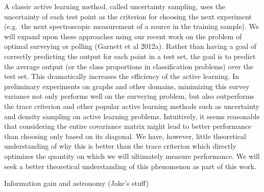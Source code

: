 \documentclass[useAMS,usenatbib,tightenlines,11pt,preprint]{aastex}
\begin{document}
A classic active learning method, called uncertainty sampling, uses
the uncertainty of each test point as the criterion for choosing the
next experiment (e.g.\ the next spectroscopic measurement of a source
in the training sample).  We will expand upon these approaches using
our recent work on the problem of optimal surveying or polling
(Garnett et al 2012a).  Rather than having a goal of correctly
predicting the output for each point in a test set, the goal is to
predict the average output (or the class proportions in classification
problems) over the test set.  This dramatically increases the
efficiency of the active learning.  In preliminary experiments on
graphs and other domains, minimizing this survey variance not only
performs well on the surveying problem, but also outperforms the trace
criterion and other popular active learning methods such as
uncertainty and density sampling on active learning problems.
Intuitively, it seems reasonable that considering the entire
covariance matrix might lead to better performance than choosing only
based on its diagonal.  We have, however, little theoretical understanding of
why this is better than the trace criterion which directly optimizes
the quantity on which we will ultimately measure performance.  We will
seek a better theoretical understanding of this phenomenon as part of
this work.



Information gain and astronomy (Jake's stuff)
\end{document}
